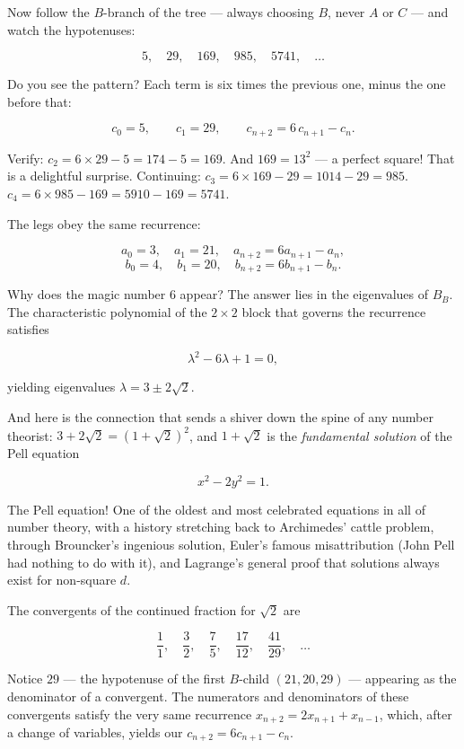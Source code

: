 \documentclass[12pt, letterpaper, openany]{book}
\theoremstyle{definition}
\theoremstyle{remark}
\begin{document}
Now follow the $B$-branch of the tree --- always choosing $B$, never $A$ or $C$ --- and watch the hypotenuses:

\[
5, \quad 29, \quad 169, \quad 985, \quad 5741, \quad \ldots
\]

Do you see the pattern? Each term is six times the previous one, minus the one before that:

\[
c_0 = 5, \qquad c_1 = 29, \qquad c_{n+2} = 6\,c_{n+1} - c_n.
\]

Verify: $c_2 = 6 \times 29 - 5 = 174 - 5 = 169$. And $169 = 13^2$ --- a perfect square! That is a delightful surprise. Continuing: $c_3 = 6 \times 169 - 29 = 1014 - 29 = 985$. $c_4 = 6 \times 985 - 169 = 5910 - 169 = 5741$.

The legs obey the same recurrence:

\[
a_0 = 3,\quad a_1 = 21,\quad a_{n+2} = 6a_{n+1} - a_n,
\]
\[
b_0 = 4,\quad b_1 = 20,\quad b_{n+2} = 6b_{n+1} - b_n.
\]

Why does the magic number $6$ appear? The answer lies in the eigenvalues of $B_B$. The characteristic polynomial of the $2 \times 2$ block that governs the recurrence satisfies

\[
\lambda^2 - 6\lambda + 1 = 0,
\]

yielding eigenvalues $\lambda = 3 \pm 2\sqrt{2}$.

And here is the connection that sends a shiver down the spine of any number theorist: $3 + 2\sqrt{2} = (1 + \sqrt{2})^2$, and $1 + \sqrt{2}$ is the \textit{fundamental solution} of the Pell equation

\[
x^2 - 2y^2 = 1.
\]

The Pell equation! One of the oldest and most celebrated equations in all of number theory, with a history stretching back to Archimedes' cattle problem, through Brouncker's ingenious solution, Euler's famous misattribution (John Pell had nothing to do with it), and Lagrange's general proof that solutions always exist for non-square $d$.

The convergents of the continued fraction for $\sqrt{2}$ are

\[
\frac{1}{1}, \quad \frac{3}{2}, \quad \frac{7}{5}, \quad \frac{17}{12}, \quad \frac{41}{29}, \quad \ldots
\]

Notice $29$ --- the hypotenuse of the first $B$-child $(21, 20, 29)$ --- appearing as the denominator of a convergent. The numerators and denominators of these convergents satisfy the very same recurrence $x_{n+2} = 2x_{n+1} + x_{n-1}$, which, after a change of variables, yields our $c_{n+2} = 6c_{n+1} - c_n$.
\end{document}

